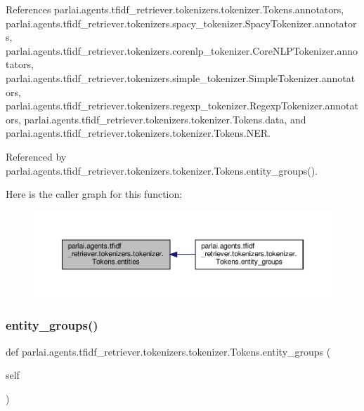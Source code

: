 References parlai.\+agents.\+tfidf\+\_\+retriever.\+tokenizers.\+tokenizer.\+Tokens.\+annotators, parlai.\+agents.\+tfidf\+\_\+retriever.\+tokenizers.\+spacy\+\_\+tokenizer.\+Spacy\+Tokenizer.\+annotators, parlai.\+agents.\+tfidf\+\_\+retriever.\+tokenizers.\+corenlp\+\_\+tokenizer.\+Core\+N\+L\+P\+Tokenizer.\+annotators, parlai.\+agents.\+tfidf\+\_\+retriever.\+tokenizers.\+simple\+\_\+tokenizer.\+Simple\+Tokenizer.\+annotators, parlai.\+agents.\+tfidf\+\_\+retriever.\+tokenizers.\+regexp\+\_\+tokenizer.\+Regexp\+Tokenizer.\+annotators, parlai.\+agents.\+tfidf\+\_\+retriever.\+tokenizers.\+tokenizer.\+Tokens.\+data, and parlai.\+agents.\+tfidf\+\_\+retriever.\+tokenizers.\+tokenizer.\+Tokens.\+N\+ER.



Referenced by parlai.\+agents.\+tfidf\+\_\+retriever.\+tokenizers.\+tokenizer.\+Tokens.\+entity\+\_\+groups().

Here is the caller graph for this function\+:
\nopagebreak
\begin{figure}[H]
\begin{center}
\leavevmode
\includegraphics[width=350pt]{classparlai_1_1agents_1_1tfidf__retriever_1_1tokenizers_1_1tokenizer_1_1Tokens_ab5d74ebfda5597b48f1ddc5f607292de_icgraph}
\end{center}
\end{figure}
\mbox{\label{classparlai_1_1agents_1_1tfidf__retriever_1_1tokenizers_1_1tokenizer_1_1Tokens_af76da989bcd6090398f0e63b8c30de22}} 
\subsubsection{\texorpdfstring{entity\+\_\+groups()}{entity\_groups()}}
{\footnotesize\ttfamily def parlai.\+agents.\+tfidf\+\_\+retriever.\+tokenizers.\+tokenizer.\+Tokens.\+entity\+\_\+groups (\begin{DoxyParamCaption}\item[{}]{self }\end{DoxyParamCaption})}

